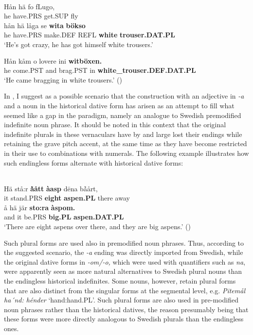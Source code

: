 \ea\label{}
\\
\gll Hån  hä  fo  fLugo,\\
he  have.PRS  get.SUP  fly\\
\gll hån  hä  låga  se  \textbf{wita} \textbf{bökso}\\
he  have.PRS  make.DEF  REFL  \textbf{white} \textbf{trouser.DAT.PL}\\
\glt ‘He’s got crazy, he has got himself white trousers.’

\z

\ea
\gll Hån  kåm  o  lovere  ini  \textbf{witböxen.}\\
he  come.PST  and  brag.PST  in  \textbf{white\_trouser.DEF.DAT.PL}\\
\glt ‘He came bragging in white trousers.’ (\citet[105]{Nyström1993})

\z

In \citet{Dahl2008}, I suggest as a possible scenario that the construction with an adjective in\textit{ {}-a} and a noun in the historical dative form has arisen as an attempt to fill what seemed like a gap in the paradigm, namely an analogue to Swedish premodified indefinite noun phrase. It should be noted in this context that the original indefinite plurals in these vernaculars have by and large lost their endings while retaining the grave pitch accent, at the same time as they have become restricted in their use to combinations with numerals. The following example illustrates how such endingless forms alternate with historical dative forms: 

\ea \label{} 
\\
\gll Hä  stå:r  \textbf{\`{å}ått} \textbf{àasp} d\=ena  b\`{å}årt,\\
it  stand.PRS  \textbf{eight} \textbf{aspen.PL} there  away\\
\gll å  hä  jär  \textbf{sto:ra} \textbf{àspom.}\\
and  it  be.PRS  \textbf{big.PL} \textbf{aspen.DAT.PL}\\
\glt ‘There are eight aspens over there, and they are big aspens.’ (\citet[20]{LidströmEtAl1991}) 

\z

Such plural forms are used also in premodified noun phrases. Thus, according to the suggested scenario, the\textit{ {}-a} ending was directly imported from Swedish, while the original dative forms in\textit{ {}-om/-o,} which were used with quantifiers such as \textit{na},\textit{ }were apparently seen as more natural alternatives to Swedish plural nouns than the endingless historical indefinites. Some nouns, however, retain plural forms that are also distinct from the singular forms at the segmental level, e.g. \textit{Pitemål} \textit{ha´nd: hénder} ‘hand:hand.PL’.  Such plural forms are also used in pre-modified noun phrases rather than the historical datives, the reason presumably being that these forms were more directly analogous to Swedish plurals than the endingless ones. 

